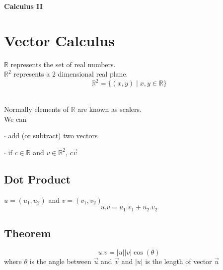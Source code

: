 \documentclass{article}
\begin{document}
\begin{center}
    \begin{LARGE}
        \textbf{Calculus II}
    \end{LARGE}
\end{center}

\section{Vector Calculus}

$\mathbb{R}$ represents the set of real numbers.\\[1pt]
$\mathbb{R}^2$ represents a 2 dimensional real plane. \\[1pt]
$$\mathbb{R}^2 = \{(x,y) \mid x,y \in \mathbb{R}\}$$


\\[1pt]
Normally elements of $\mathbb{R}$ are known as scalers.\\[1pt]
We can 

$\cdot$ add (or subtract) two vectors

$\cdot$ if $c \in \mathbb{R}$ and $v \in \mathbb{R}^2$,  $c\vec{v}$ 

\subsection*{Dot Product}
$u = (u_1, u_2)$ and $v = (v_1, v_2)$ $$u.v = u_1.v_1 + u_2.v_2$$

\subsection*{Theorem}
$$u.v = |u||v| \cos(\theta)$$
where $\theta$ is the angle between $\vec{u}$ and $\vec{v}$
and $|u|$ is the length of vector $\vec{u}$
\end{document}
